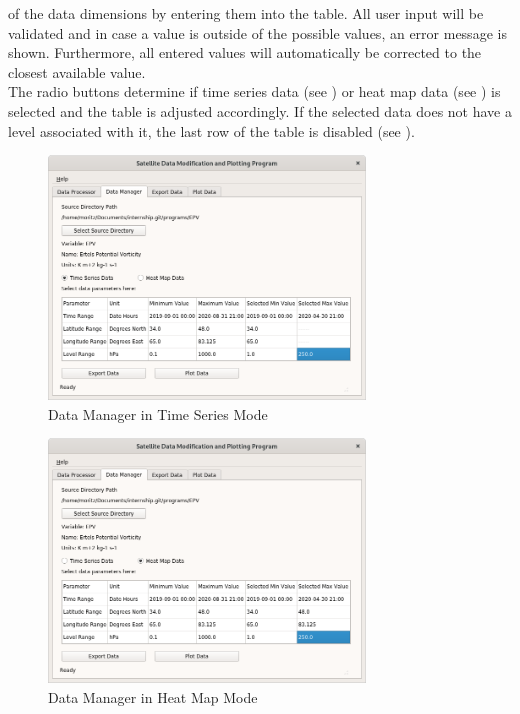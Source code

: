 \documentclass[../00_main.tex]{subfiles}
\begin{document}
\begin{enumerate}
        of the data dimensions by entering them into the table. All user input 
        will be validated and in case a value is outside of the possible 
        values, an error message is shown. Furthermore, all entered values will
        automatically be corrected to the closest available value. \\
        The radio buttons determine if time series data (see ) or 
        heat map data (see ) is selected and the table is adjusted 
        accordingly. If the selected data does not have a level associated with 
        it, the last row of the table is disabled (see ).
        \begin{figure}[H]
            \center
            \includegraphics[width=0.75\textwidth]{../graphics/dm03}
            \caption{Data Manager in Time Series Mode}
            \label{dm03}
        \end{figure}
        \begin{figure}[H]
            \center
            \includegraphics[width=0.75\textwidth]{../graphics/dm04}
            \caption{Data Manager in Heat Map Mode}

\end{figure}
\end{enumerate}
\end{document}
